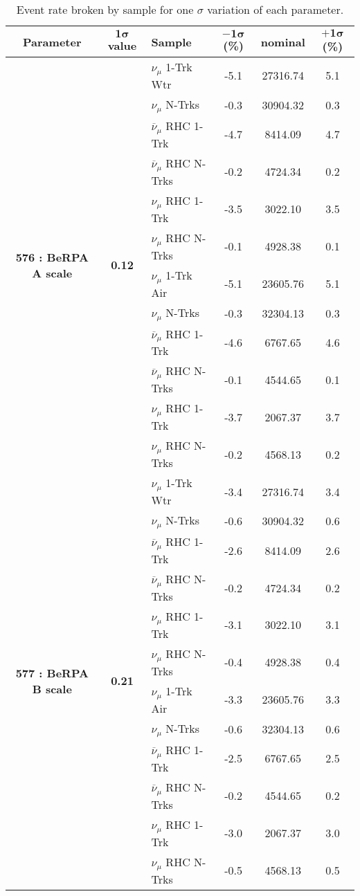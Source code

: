 \addtocounter{table}{-1}
\begin{table}[ht!]
\centering
\begin{tabular}{ c  c  l  c  c  c }
\midrule[1.3pt]
\textbf{Parameter} & \textbf{$\mathbf{1\sigma}$ value} & \textbf{Sample} & \textbf{$\mathbf{-1\sigma}$ (\%)}  &  \textbf{nominal}  &  \textbf{$\mathbf{+1\sigma}$ (\%)} \\
\midrule[1.3pt]
\multirow{12}{*}{\textbf{576 : BeRPA A scale}} & \multirow{12}{*}{\textbf{0.12}} & $\nu_\mu$ 1-Trk Wtr &   -5.1 &  27316.74 &   5.1 \\ 
 &  & $\nu_\mu$ N-Trks &   -0.3 &  30904.32 &   0.3 \\ 
 &  & $\overline{\nu}_\mu$ RHC 1-Trk &   -4.7 &  8414.09 &   4.7 \\ 
 &  & $\overline{\nu}_\mu$ RHC N-Trks &   -0.2 &  4724.34 &   0.2 \\ 
 &  & $\nu_\mu$ RHC 1-Trk &   -3.5 &  3022.10 &   3.5 \\ 
 &  & $\nu_\mu$ RHC N-Trks &   -0.1 &  4928.38 &   0.1 \\ 
 &  & $\nu_\mu$ 1-Trk Air &   -5.1 &  23605.76 &   5.1 \\ 
 &  & $\nu_\mu$ N-Trks &   -0.3 &  32304.13 &   0.3 \\ 
 &  & $\overline{\nu}_\mu$ RHC 1-Trk &   -4.6 &  6767.65 &   4.6 \\ 
 &  & $\overline{\nu}_\mu$ RHC N-Trks &   -0.1 &  4544.65 &   0.1 \\ 
 &  & $\nu_\mu$ RHC 1-Trk &   -3.7 &  2067.37 &   3.7 \\ 
 &  & $\nu_\mu$ RHC N-Trks &   -0.2 &  4568.13 &   0.2 \\ 
\midrule[1.3pt]
\multirow{12}{*}{\textbf{577 : BeRPA B scale}} & \multirow{12}{*}{\textbf{0.21}} & $\nu_\mu$ 1-Trk Wtr &   -3.4 &  27316.74 &   3.4 \\ 
 &  & $\nu_\mu$ N-Trks &   -0.6 &  30904.32 &   0.6 \\ 
 &  & $\overline{\nu}_\mu$ RHC 1-Trk &   -2.6 &  8414.09 &   2.6 \\ 
 &  & $\overline{\nu}_\mu$ RHC N-Trks &   -0.2 &  4724.34 &   0.2 \\ 
 &  & $\nu_\mu$ RHC 1-Trk &   -3.1 &  3022.10 &   3.1 \\ 
 &  & $\nu_\mu$ RHC N-Trks &   -0.4 &  4928.38 &   0.4 \\ 
 &  & $\nu_\mu$ 1-Trk Air &   -3.3 &  23605.76 &   3.3 \\ 
 &  & $\nu_\mu$ N-Trks &   -0.6 &  32304.13 &   0.6 \\ 
 &  & $\overline{\nu}_\mu$ RHC 1-Trk &   -2.5 &  6767.65 &   2.5 \\ 
 &  & $\overline{\nu}_\mu$ RHC N-Trks &   -0.2 &  4544.65 &   0.2 \\ 
 &  & $\nu_\mu$ RHC 1-Trk &   -3.0 &  2067.37 &   3.0 \\ 
 &  & $\nu_\mu$ RHC N-Trks &   -0.5 &  4568.13 &   0.5 \\ 
\midrule[1.3pt]
\end{tabular}
\centering
\caption{Event rate broken by sample for one $\sigma$ variation of each parameter.}
\end{table}

